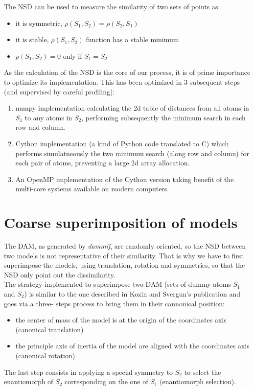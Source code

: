 \documentclass[a4paper, 11pt]{report}
\begin{document}
The NSD can be used to measure the similarity of two sets of points as:
\begin{itemize}
 \item it is symmetric, $\rho(S_{1},S_{2}) = \rho(S_{2},S_{1})$
 \item it is stable, $\rho(S_{1},S_{2})$ function has a stable minimum
 \item $\rho(S_{1},S_{2}) = 0$ only if $S_{1} = S_{2}$
\end{itemize}

As the calculation of the NSD is the core of our process, it is of prime  
importance to optimize its implementation. This has been optimized in 3
subsequent steps (and supervised by careful profiling):
\begin{enumerate}
  \item numpy implementation calculating the 2d table of distances from all
  atoms in $S_{1}$ to any atoms in $S_{2}$, performing subsequently the minimum
  search in each row and column.
  \item Cython implementation \cite{cython} (a kind of Python code translated
  to C) which performs simulatneously the two minimum search (along row and
  column) for each pair of atoms, preventing a large 2d array allocation.
  \item An OpenMP \cite{openmp} implementation of the Cython version taking
  benefit of the multi-core systems available on modern computers.
\end{enumerate}

\section{Coarse superimposition of models}

The DAM, as generated by \textit{dammif}, are randomly oriented, so the NSD
between two models is not representative of their similarity.
That is why we have to first superimpose the models, using translation, rotation
and symmetries, so that the NSD only point out the dissimilarity.\\

The strategy implemented to superimpose two DAM (sets of
dummy-atoms $S_{1}$ and $S_{2}$) is similar to the one described in 
Kozin and Svergun's publication \cite{supcomb} and goes via a three-
steps process to bring them in their cannonical position:
\begin{itemize}
  \item the center of mass of the model is at the origin of the 
        coordinates axis (canonical translation)
  \item the principle axis of inertia of the model are aligned with 
        the coordinates axis (canonical rotation)
\end{itemize}
The last step consists in applying a special symmetry to $S_{2}$ to 
select the enantiomorph of $S_{2}$ corresponding on the one of $S_{1}$ 
(enantiomorph selection).
\end{document}
